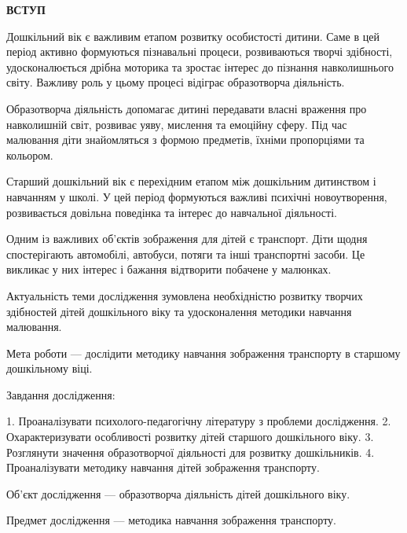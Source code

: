 \documentclass[14pt,a4paper]{extreport}
\newcommand{\myintro}[1]{
\begin{center}
\textbf{\MakeUppercase{#1}}
\end{center}
\vspace{10pt}
}
\begin{document}
\tableofcontents

\newpage


\myintro{ВСТУП}

Дошкільний вік є важливим етапом розвитку особистості дитини. Саме в цей період активно формуються пізнавальні процеси, розвиваються творчі здібності, удосконалюється дрібна моторика та зростає інтерес до пізнання навколишнього світу. Важливу роль у цьому процесі відіграє образотворча діяльність.

Образотворча діяльність допомагає дитині передавати власні враження про навколишній світ, розвиває уяву, мислення та емоційну сферу. Під час малювання діти знайомляться з формою предметів, їхніми пропорціями та кольором.

Старший дошкільний вік є перехідним етапом між дошкільним дитинством і навчанням у школі. У цей період формуються важливі психічні новоутворення, розвивається довільна поведінка та інтерес до навчальної діяльності.

Одним із важливих об'єктів зображення для дітей є транспорт. Діти щодня спостерігають автомобілі, автобуси, потяги та інші транспортні засоби. Це викликає у них інтерес і бажання відтворити побачене у малюнках.

Актуальність теми дослідження зумовлена необхідністю розвитку творчих здібностей дітей дошкільного віку та удосконалення методики навчання малювання.

Мета роботи — дослідити методику навчання зображення транспорту в старшому дошкільному віці.

Завдання дослідження:

1. Проаналізувати психолого-педагогічну літературу з проблеми дослідження.
2. Охарактеризувати особливості розвитку дітей старшого дошкільного віку.
3. Розглянути значення образотворчої діяльності для розвитку дошкільників.
4. Проаналізувати методику навчання дітей зображення транспорту.

Об’єкт дослідження — образотворча діяльність дітей дошкільного віку.

Предмет дослідження — методика навчання зображення транспорту.

\newpage

\end{document}
